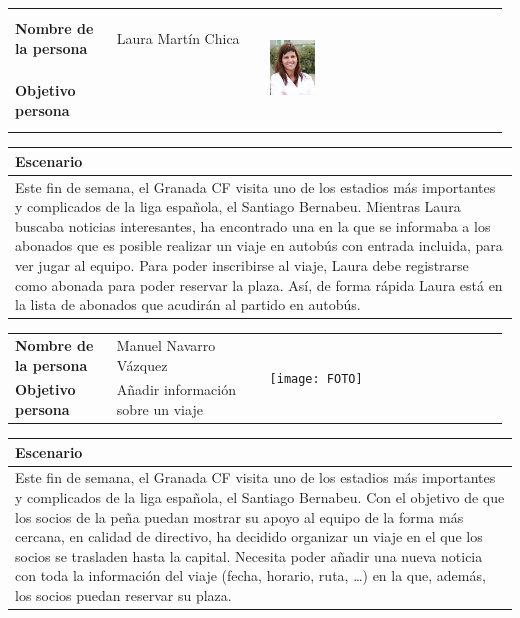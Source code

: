 \documentclass[11pt]{article}
\begin{document}
\begin{table}[H]
  \centering
  \begin{tabular}{p{0.2\linewidth}|p{0.3\linewidth}p{0.475\linewidth}}
    \toprule
    \textbf{Nombre de la persona} & Laura Martín Chica &\multirow{2}{*}{\begin{minipage}{1.\textwidth}\includegraphics[width=0.2\textwidth, height=30mm]{Ana}\end{minipage}}\\
    \textbf{Objetivo persona} &  & \\
    \bottomrule
  \end{tabular}

\begin{tabular}{p{1.028\linewidth}}
  \textbf{Escenario}\\
  \midrule
  Este fin de semana, el Granada CF visita uno de los estadios más importantes y complicados de la liga española, el Santiago Bernabeu. Mientras Laura buscaba noticias interesantes, ha encontrado una en la que se informaba a los abonados que es posible realizar un viaje en autobús con entrada incluida, para ver jugar al equipo. Para poder inscribirse al viaje, Laura debe registrarse como abonada para poder reservar la plaza.
Así, de forma rápida Laura está en la lista de abonados que acudirán al partido en autobús. 
\end{tabular}
\end{table}

\begin{table}[H]
  \centering
  \begin{tabular}{p{0.2\linewidth}|p{0.3\linewidth}p{0.475\linewidth}}
    \toprule
    \textbf{Nombre de la persona} & Manuel Navarro Vázquez &\multirow{2}{*}{\begin{minipage}{1.\textwidth}\texttt{[image: FOTO]}\end{minipage}}\\
    \textbf{Objetivo persona} & Añadir información sobre un viaje & \\
    \bottomrule
  \end{tabular}

\begin{tabular}{p{1.028\linewidth}}
  \textbf{Escenario}\\
  \midrule
  Este fin de semana, el Granada CF visita uno de los estadios más importantes y complicados de la liga española, el Santiago Bernabeu. Con el objetivo de que los socios de la peña puedan mostrar su apoyo al equipo de la forma más cercana, en calidad de directivo, ha decidido organizar un viaje en el que los socios se trasladen hasta la capital. Necesita poder añadir una nueva noticia con toda la información del viaje (fecha, horario, ruta, \dots) en la que, además, los socios puedan reservar su plaza.
\end{tabular}
\end{table}
 
\end{document}
